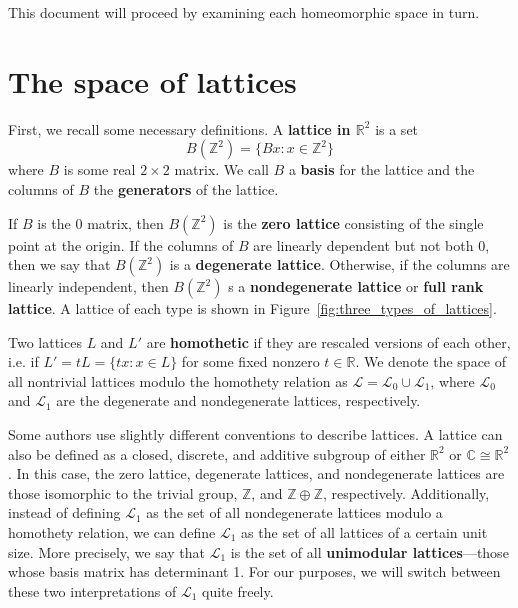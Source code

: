 \documentclass[12pt,twoside]{reedthesis}
\theoremstyle{definition}
\newcommand{\Z}{\mathbb{Z}}
\newcommand{\R}{\mathbb{R}}
\newcommand{\C}{\mathbb{C}}
\newcommand{\LS}{\mathcal{L}}
\newcommand{\defnphrase}[1]{\textbf{#1}}
\begin{document}
This document will proceed by examining each homeomorphic space in turn.

\chapter{The space of lattices}

First, we recall some necessary definitions.
A \defnphrase{lattice in $\R^2$} is a set
\begin{equation*}
  B(\Z^2) = \{ B x : x \in \Z^2 \}
\end{equation*}
where $B$ is some real $2 \times 2$ matrix.
We call $B$ a \defnphrase{basis} for the lattice and the columns of $B$ the \defnphrase{generators} of the lattice.

If $B$ is the 0 matrix, then $B(\Z^2)$ is the \defnphrase{zero lattice} consisting of the single point at the origin.
If the columns of $B$ are linearly dependent but not both 0, then we say that $B(\Z^2)$ is a \defnphrase{degenerate lattice}.
Otherwise, if the columns are linearly independent, then $B(\Z^2)$ s a \defnphrase{nondegenerate lattice} or \defnphrase{full rank lattice}.
A lattice of each type is shown in Figure~\ref{fig:three_types_of_lattices}.

Two lattices $L$ and $L'$ are \defnphrase{homothetic} if they are rescaled versions of each other, i.e. if $L' = tL = \{t x : x \in L\}$ for some fixed nonzero $t \in \R$.
We denote the space of all nontrivial lattices modulo the homothety relation as $\LS = \LS_0 \cup \LS_1$, where $\LS_0$ and $\LS_1$ are the degenerate and nondegenerate lattices, respectively.

Some authors use slightly different conventions to describe lattices.
A lattice can also be defined as a closed, discrete, and additive subgroup of either $\R^2$ or $\C \cong \R^2$.
In this case, the zero lattice, degenerate lattices, and nondegenerate lattices are those isomorphic to the trivial group, $\Z$, and $\Z \oplus \Z$, respectively.
Additionally, instead of defining $\LS_1$ as the set of all nondegenerate lattices modulo a homothety relation, we can define $\LS_1$ as the set of all lattices of a certain unit size.
More precisely, we say that $\LS_1$ is the set of all \defnphrase{unimodular lattices}---those whose basis matrix has determinant 1.
For our purposes, we will switch between these two interpretations of $\LS_1$ quite freely.
\end{document}
